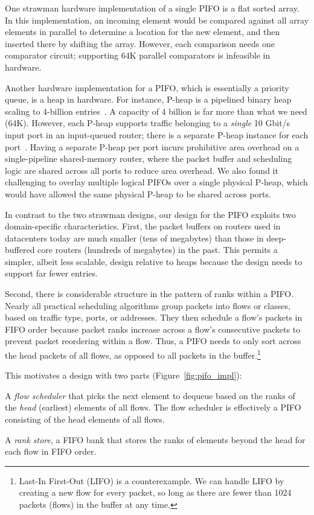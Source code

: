 One strawman hardware implementation of a single PIFO is a flat sorted array.
In this implementation, an incoming element would be compared against all array
elements in parallel to determine a location for the new element, and then
inserted there by shifting the array.  However, each comparison needs one
comparator circuit; supporting 64K parallel comparators is infeasible in
hardware.

Another hardware implementation for a PIFO, which is essentially a priority
queue, is a heap in hardware. For instance, P-heap is a pipelined binary heap
scaling to 4-billion entries~\cite{bhagwan, pheap}. A capacity of 4 billion is
far more than what we need (64K).  However, each P-heap supports traffic
belonging to a {\em single} 10 Gbit/s input port in an input-queued router;
there is a separate P-heap instance for each port~\cite{bhagwan}.  Having a
separate P-heap per port incurs prohibitive area overhead on a single-pipeline
shared-memory router, where the packet buffer and scheduling logic are shared
across all ports to reduce area overhead.  We also found it challenging to
overlay multiple logical PIFOs over a single physical P-heap, which would have
allowed the same physical P-heap to be shared across ports.

In contrast to the two strawman designs, our design for the PIFO exploits two
domain-specific characteristics. First, the packet buffers on routers used in
datacenters today are much smaller (tens of megabytes) than those in
deep-buffered core routers (hundreds of megabytes) in the past.  This permits a
simpler, albeit less scalable, design relative to heaps because the design
needs to support far fewer entries.

Second, there is considerable structure in the pattern of ranks within a PIFO.
Nearly all practical scheduling algorithms group packets into flows or classes,
\eg based on traffic type, ports, or addresses. They then schedule a flow's
packets in FIFO order because packet ranks increase across a flow's consecutive
packets to prevent packet reordering within a flow. Thus, a PIFO needs to only
sort across the head packets of all flows, as opposed to all packets in the
buffer.\footnote{Last-In First-Out (LIFO) is a counterexample.  We can handle
LIFO by creating a new flow for every packet, so long as there are fewer than
1024 packets (flows) in the buffer at any time.}

This motivates a design with two parts (Figure~\ref{fig:pifo_impl}):
\begin{CompactEnumerate}
\item A {\em flow scheduler} that picks the next element to dequeue based on
the ranks of the {\em head} (earliest) elements of all flows. The flow
scheduler is effectively a PIFO consisting of the head elements of all flows.
\item A {\em rank store}, a FIFO bank that stores the ranks of elements beyond
the head for each flow in FIFO order.
\end{CompactEnumerate}

